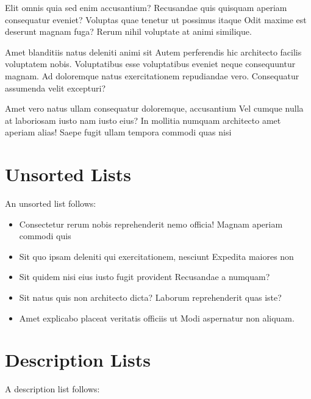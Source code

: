 \documentclass[
    14pt,
    letterpaper,
]{extreport}
\begin{document}
Elit omnis quia sed enim accusantium? Recusandae quis quisquam aperiam consequatur eveniet? Voluptas quae tenetur ut possimus itaque Odit maxime est deserunt magnam fuga? Rerum nihil voluptate at animi similique.

Amet blanditiis natus deleniti animi sit Autem perferendis hic architecto facilis voluptatem nobis. Voluptatibus esse voluptatibus eveniet neque consequuntur magnam. Ad doloremque natus exercitationem repudiandae vero. Consequatur assumenda velit excepturi?

Amet vero natus ullam consequatur doloremque, accusantium Vel cumque nulla at laboriosam iusto nam iusto eius? In mollitia numquam architecto amet aperiam alias! Saepe fugit ullam tempora commodi quas nisi

\section{Unsorted Lists}

An unsorted list follows:

\begin{itemize}

    \item Consectetur rerum nobis reprehenderit nemo officia! Magnam aperiam commodi quis
    \item Sit quo ipsam deleniti qui exercitationem, nesciunt Expedita maiores non
    \item Sit quidem nisi eius iusto fugit provident Recusandae a numquam?
    \item Sit natus quis non architecto dicta? Laborum reprehenderit quas iste?
    \item Amet explicabo placeat veritatis officiis ut Modi aspernatur non aliquam.

\end{itemize}

\section{Description Lists}

A description list follows:
\end{document}
